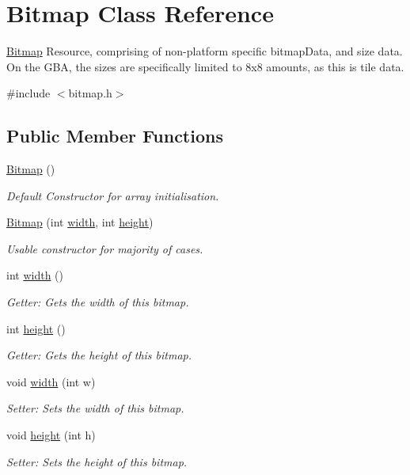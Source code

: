 \hypertarget{class_bitmap}{\section{Bitmap Class Reference}
\label{class_bitmap}
}


\hyperlink{class_bitmap}{Bitmap} Resource, comprising of non-\/platform specific bitmap\-Data, and size data. On the G\-B\-A, the sizes are specifically limited to 8x8 amounts, as this is tile data.  




{\ttfamily \#include $<$bitmap.\-h$>$}

\subsection*{Public Member Functions}
\begin{DoxyCompactItemize}
\item 
\hyperlink{class_bitmap_aa6ef6d8c0b66664350ef4dd062db3aec}{Bitmap} ()
\begin{DoxyCompactList}\small\item\em Default Constructor for array initialisation. \end{DoxyCompactList}\item 
\hyperlink{class_bitmap_a40526748415c8bbc58a8510d636c20f4}{Bitmap} (int \hyperlink{class_bitmap_ac62a2cfe38ad61efc376d41fc6a86626}{width}, int \hyperlink{class_bitmap_aa3c108177eab78db3bcadafa59d8ea4f}{height})
\begin{DoxyCompactList}\small\item\em Usable constructor for majority of cases. \end{DoxyCompactList}\item 
int \hyperlink{class_bitmap_ac62a2cfe38ad61efc376d41fc6a86626}{width} ()
\begin{DoxyCompactList}\small\item\em Getter\-: Gets the width of this bitmap. \end{DoxyCompactList}\item 
int \hyperlink{class_bitmap_aa3c108177eab78db3bcadafa59d8ea4f}{height} ()
\begin{DoxyCompactList}\small\item\em Getter\-: Gets the height of this bitmap. \end{DoxyCompactList}\item 
void \hyperlink{class_bitmap_aa68646aa6c452bdc74bc6263046fa499}{width} (int w)
\begin{DoxyCompactList}\small\item\em Setter\-: Sets the width of this bitmap. \end{DoxyCompactList}\item 
void \hyperlink{class_bitmap_a40d4ccd0bb0baaea7abb01068413c63f}{height} (int h)
\begin{DoxyCompactList}\small\item\em Setter\-: Sets the height of this bitmap. \end{DoxyCompactList}\end{DoxyCompactItemize}
